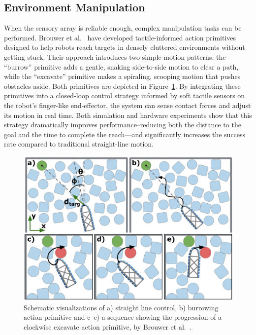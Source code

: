 \subsection{Environment Manipulation}
When the sensory array is reliable enough, complex manipulation tasks can be performed.
Brouwer et al.~\cite{Brouwer2024TactileInformedAP} have developed tactile-informed action primitives designed to help robots reach targets in densely cluttered environments without getting stuck.
Their approach introduces two simple motion patterns: the \enquote{burrow} primitive adds a gentle, snaking side-to-side motion to clear a path, while the \enquote{excavate} primitive makes a spiraling, scooping motion that pushes obstacles aside.
Both primitives are depicted in Figure~\ref{fig:environment-manipulation}.
By integrating these primitives into a closed-loop control strategy informed by soft tactile sensors on the robot’s finger-like end-effector, the system can sense contact forces and adjust its motion in real time.
Both simulation and hardware experiments show that this strategy dramatically improves performance--reducing both the distance to the goal and the time to complete the reach—and significantly increases the success rate compared to traditional straight-line motion.

\begin{figure}[htb]
    \centering
    \includegraphics[width=\textwidth]{figures/environment-manipulation}
    \caption{Schematic visualizations of a) straight line control, b) burrowing action primitive and c–e) a sequence showing the progression of a clockwise excavate action primitive, by Brouwer et al.~\cite{Brouwer2024TactileInformedAP}.}
    \label{fig:environment-manipulation}
\end{figure}